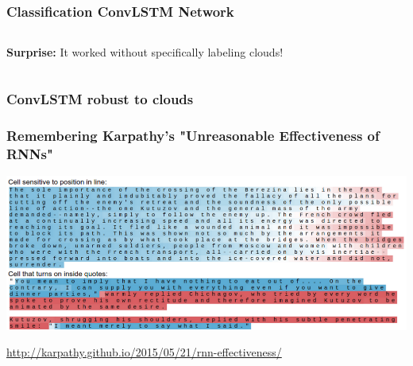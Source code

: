 %


%


\begin{frame}
\frametitle{Classification ConvLSTM Network}

\end{frame}


\begin{frame}

\vfill
\Huge\color{black}
\begin{center}
	\begin{columns}
		\column{\textwidth}
		\vspace{7em}
		
		\textbf{Surprise:} 
		\hfill It worked without specifically labeling clouds!
	\end{columns}
\end{center}

\vfill

\end{frame}


\begin{frame}
\frametitle{ConvLSTM robust to clouds}


\end{frame}


\begin{frame}
	\frametitle{Remembering Karpathy's "Unreasonable Effectiveness of RNNs"}
	
	\includegraphics[width=\textwidth]{images/karpathy}
	
	\url{http://karpathy.github.io/2015/05/21/rnn-effectiveness/}
\end{frame}


